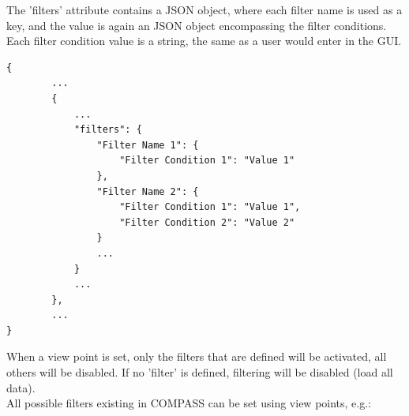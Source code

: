 The 'filters' attribute contains a JSON object, where each filter name is used as a key, and the value is again an JSON object encompassing the filter conditions. Each filter condition value is a string, the same as a user would enter in the GUI.

\begin{lstlisting}[basicstyle=\small\ttfamily]
{
        ...
        {
            ...
            "filters": {
                "Filter Name 1": {
                    "Filter Condition 1": "Value 1"
                },
                "Filter Name 2": {
                    "Filter Condition 1": "Value 1",
                    "Filter Condition 2": "Value 2"
                }
                ...
            }
            ...
        },
        ...
}
\end{lstlisting}      

When a view point is set, only the filters that are defined will be activated, all others will be disabled. If no 'filter' is defined, filtering will be disabled (load all data). \\

All possible filters existing in COMPASS can be set using view points, e.g.:

